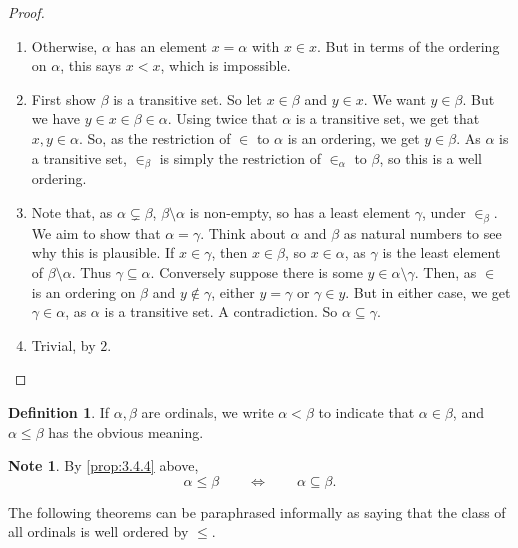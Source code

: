 \documentclass{article}
\theoremstyle{definition}\newtheorem{definition}{Definition}[subsection]
\theoremstyle{definition}\newtheorem{remark1}[definition]{Remark}
\theoremstyle{definition}\newtheorem{example1}[definition]{Example}
\theoremstyle{definition}\newtheorem*{remark2}{Remark}
\theoremstyle{definition}\newtheorem*{example2}{Example}
\theoremstyle{definition}\newtheorem*{note}{Note}
\theoremstyle{definition}\newtheorem*{notation}{Notation}
\begin{document}
\begin{proof}
\hfill
\begin{enumerate}
\item Otherwise, $ \alpha $ has an element $ x = \alpha $ with $ x \in x $. But in terms of the ordering on $ \alpha $, this says $ x < x $, which is impossible.
\item First show $ \beta $ is a transitive set. So let $ x \in \beta $ and $ y \in x $. We want $ y \in \beta $. But we have $ y \in x \in \beta \in \alpha $. Using twice that $ \alpha $ is a transitive set, we get that $ x, y \in \alpha $. So, as the restriction of $ \in $ to $ \alpha $ is an ordering, we get $ y \in \beta $. As $ \alpha $ is a transitive set, $ \in_\beta $ is simply the restriction of $ \in_\alpha $ to $ \beta $, so this is a well ordering.
\item Note that, as $ \alpha \subsetneq \beta $, $ \beta \setminus \alpha $ is non-empty, so has a least element $ \gamma $, under $ \in_\beta $. We aim to show that $ \alpha = \gamma $. Think about $ \alpha $ and $ \beta $ as natural numbers to see why this is plausible. If $ x \in \gamma $, then $ x \in \beta $, so $ x \in \alpha $, as $ \gamma $ is the least element of $ \beta \setminus \alpha $. Thus $ \gamma \subseteq \alpha $. Conversely suppose there is some $ y \in \alpha \setminus \gamma $. Then, as $ \in $ is an ordering on $ \beta $ and $ y \notin \gamma $, either $ y = \gamma $ or $ \gamma \in y $. But in either case, we get $ \gamma \in \alpha $, as $ \alpha $ is a transitive set. A contradiction. So $ \alpha \subseteq \gamma $.
\item Trivial, by $ 2 $.
\end{enumerate}
\end{proof}

\pagebreak

\begin{definition}
If $ \alpha, \beta $ are ordinals, we write $ \alpha < \beta $ to indicate that $ \alpha \in \beta $, and $ \alpha \le \beta $ has the obvious meaning.
\end{definition}

\begin{note}
By \ref{prop:3.4.4} above,
$$ \alpha \le \beta \qquad \iff \qquad \alpha \subseteq \beta. $$
\end{note}

The following theorems can be paraphrased informally as saying that the class of all ordinals is well ordered by $ \le $.
\end{document}
